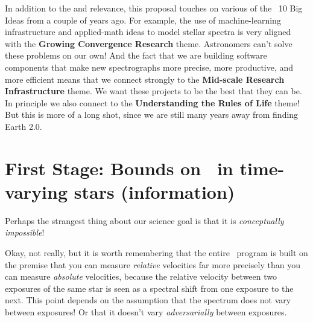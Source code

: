 \documentclass[12pt, letterpaper]{article}
\begin{document}
In addition to the  and  relevance, this proposal touches on
various of the \NSF\ 10 Big Ideas from a couple of years ago.
For example, the use of machine-learning infrastructure and applied-math ideas to model
stellar spectra is very aligned with the \textbf{Growing Convergence Research} theme.
Astronomers can't solve these problems on our own!
And the fact that we are building software components that make new spectrographs more
precise, more productive, and more efficient means that we connect strongly to the
\textbf{Mid-scale Research Infrastructure} theme.
We want these projects to be the best that they can be.
In principle we also connect to the \textbf{Understanding the Rules of Life} theme!
But this is more of a long shot, since we are still many years away from finding
Earth 2.0.


\section{First Stage: Bounds on \EPRV\ in time-varying stars (information)}

Perhaps the strangest thing about our science goal is that
it is \emph{conceptually impossible}!

Okay, not really, but it is worth remembering that the entire
\EPRV\ program is built on the premise that you can measure
\emph{relative} velocities far more precisely than you can measure
\emph{absolute} velocities, because the relative velocity between two
exposures of the same star is seen as a spectral shift from one
exposure to the next.
This point depends on the assumption that the spectrum does not vary
between exposures!
Or that it doesn't vary \emph{adversarially} between exposures.
\end{document}
